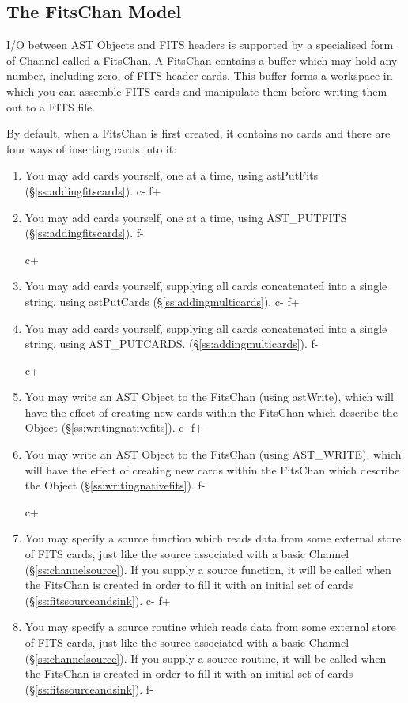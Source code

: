 \documentclass[twoside,11pt]{article}
\newcommand{\secref}[1]{\S\ref{#1}}
\newcommand{\secref}[1]{\ref{#1}}
\begin{document}
\subsection{The FitsChan Model}

I/O between AST Objects and FITS headers is supported by a specialised
form of Channel called a FitsChan. A FitsChan contains a buffer which
may hold any number, including zero, of FITS header cards. This buffer
forms a workspace in which you can assemble FITS cards and manipulate
them before writing them out to a FITS file.

By default, when a FitsChan is first created, it contains no cards and
there are four ways of inserting cards into it:

\begin{enumerate}
c+
\item You may add cards yourself, one at a time, using astPutFits
(\secref{ss:addingfitscards}).
c-
f+
\item You may add cards yourself, one at a time, using AST\_PUTFITS
(\secref{ss:addingfitscards}).
f-

c+
\item You may add cards yourself, supplying all cards concatenated into a
single string, using astPutCards
(\secref{ss:addingmulticards}).
c-
f+
\item You may add cards yourself, supplying all cards concatenated into a
single string, using AST\_PUTCARDS.
(\secref{ss:addingmulticards}).
f-

c+
\item You may write an AST Object to the FitsChan (using astWrite),
which will have the effect of creating new cards within the FitsChan
which describe the Object (\secref{ss:writingnativefits}).
c-
f+
\item You may write an AST Object to the FitsChan (using AST\_WRITE),
which will have the effect of creating new cards within the FitsChan
which describe the Object (\secref{ss:writingnativefits}).
f-

c+
\item You may specify a source function which reads data from some
external store of FITS cards, just like the source associated with a
basic Channel (\secref{ss:channelsource}). If you supply a source
function, it will be called when the FitsChan is created in order to
fill it with an initial set of cards (\secref{ss:fitssourceandsink}).
c-
f+
\item You may specify a source routine which reads data from some
external store of FITS cards, just like the source associated with a
basic Channel (\secref{ss:channelsource}). If you supply a source
routine, it will be called when the FitsChan is created in order to
fill it with an initial set of cards (\secref{ss:fitssourceandsink}).
f-
\end{enumerate}
\end{document}
